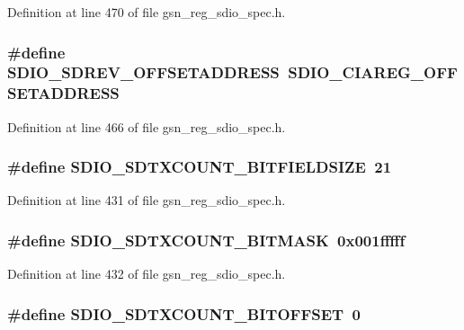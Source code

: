 Definition at line 470 of file gsn\_\-reg\_\-sdio\_\-spec.h.

\hypertarget{a00571_a4b6de30a2a11820996c90d958c69d182}{
\subsubsection[{SDIO\_\-SDREV\_\-OFFSETADDRESS}]{\setlength{\rightskip}{0pt plus 5cm}\#define SDIO\_\-SDREV\_\-OFFSETADDRESS~SDIO\_\-CIAREG\_\-OFFSETADDRESS}}
\label{a00571_a4b6de30a2a11820996c90d958c69d182}


Definition at line 466 of file gsn\_\-reg\_\-sdio\_\-spec.h.

\hypertarget{a00571_a0d77669ad18cfdb2c4695b655d1f1131}{
\subsubsection[{SDIO\_\-SDTXCOUNT\_\-BITFIELDSIZE}]{\setlength{\rightskip}{0pt plus 5cm}\#define SDIO\_\-SDTXCOUNT\_\-BITFIELDSIZE~21}}
\label{a00571_a0d77669ad18cfdb2c4695b655d1f1131}


Definition at line 431 of file gsn\_\-reg\_\-sdio\_\-spec.h.

\hypertarget{a00571_addb0c422ccc014506704e71a1ab41897}{
\subsubsection[{SDIO\_\-SDTXCOUNT\_\-BITMASK}]{\setlength{\rightskip}{0pt plus 5cm}\#define SDIO\_\-SDTXCOUNT\_\-BITMASK~0x001fffff}}
\label{a00571_addb0c422ccc014506704e71a1ab41897}


Definition at line 432 of file gsn\_\-reg\_\-sdio\_\-spec.h.

\hypertarget{a00571_a0c32638fe0d6cd92755adc383e21dc4c}{
\subsubsection[{SDIO\_\-SDTXCOUNT\_\-BITOFFSET}]{\setlength{\rightskip}{0pt plus 5cm}\#define SDIO\_\-SDTXCOUNT\_\-BITOFFSET~0}}
\label{a00571_a0c32638fe0d6cd92755adc383e21dc4c}



